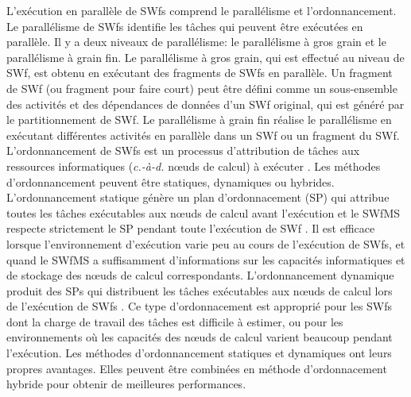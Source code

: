 L'exécution en parallèle de SWfs comprend le parallélisme et l'ordonnancement. Le parallélisme de SWfs identifie les tâches qui peuvent être exécutées en parallèle. Il y a deux niveaux de parallélisme: le parallélisme à gros grain et le parallélisme à grain fin.
Le parallélisme à gros grain, qui est effectué au niveau de SWf, est obtenu en exécutant des fragments de SWfs en parallèle. Un fragment de SWf (ou fragment pour faire court) peut être défini comme un sous-ensemble des activités et des dépendances de données d'un SWf original, qui est généré par le partitionnement de SWf. Le parallélisme à grain fin réalise le parallélisme en exécutant différentes activités en parallèle dans un SWf ou un fragment du SWf. L'ordonnancement de SWfs est un processus d'attribution de tâches aux ressources informatiques (\textit{c.-à-d.} nœuds de calcul) à exécuter \cite{Bux2013}. Les méthodes d'ordonnancement peuvent être statiques, dynamiques ou hybrides. L'ordonnancement statique génère un plan d'ordonnacement (SP) qui attribue toutes les tâches exécutables aux nœuds de calcul avant l'exécution et le SWfMS respecte strictement le SP pendant toute l'exécution de SWf \cite{Bux2013}. Il est efficace lorsque l'environnement d'exécution varie peu au cours de l'exécution de SWfs, et quand le SWfMS a suffisamment d'informations sur les capacités informatiques et de stockage des nœuds de calcul correspondants. L'ordonnancement dynamique produit des SPs qui distribuent les tâches exécutables aux nœuds de calcul lors de l'exécution de SWfs \cite{Bux2013}.
Ce type d'ordonnacement est approprié pour les SWfs dont la charge de travail des tâches est difficile à estimer, ou pour les environnements où les capacités des nœuds de calcul varient beaucoup pendant l'exécution. Les méthodes d'ordonnancement statiques et dynamiques ont leurs propres avantages. Elles peuvent être combinées en méthode d'ordonnacement hybride pour obtenir de meilleures performances.


